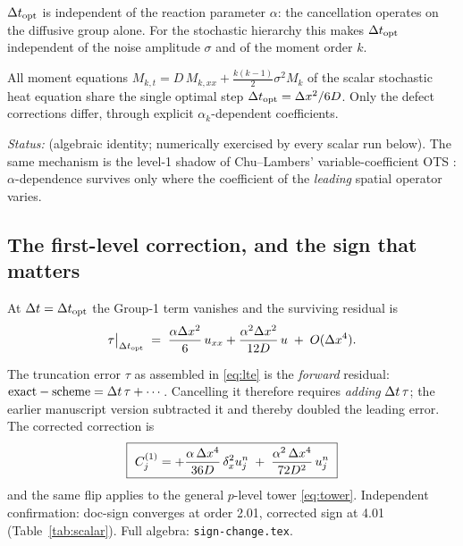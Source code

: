 \begin{proposition}\label{prop:alpha}
$\Delta t_{\mathrm{opt}}$ is independent of the reaction parameter $\alpha$: the cancellation
operates on the diffusive group alone. For the stochastic hierarchy this makes
$\Delta t_{\mathrm{opt}}$ independent of the noise amplitude $\sigma$ and of the moment order $k$.
\end{proposition}

\begin{corollary}\label{cor:indep}
All moment equations $M_{k,t} = D\,M_{k,xx} + \frac{k(k-1)}2\sigma^2 M_k$ of the
scalar stochastic heat equation share the single optimal step $\Delta t_{\mathrm{opt}}=\Delta x^2/6D$.
Only the defect corrections differ, through explicit $\alpha_k$-dependent
coefficients.
\end{corollary}
\noindent\emph{Status:} \tagP (algebraic identity; numerically exercised by every
scalar run below). The same mechanism is the level-1 shadow of
Chu--Lambers' variable-coefficient OTS \citep{chu2009}: $\alpha$-dependence
survives only where the coefficient of the \emph{leading} spatial operator varies.

\subsection{The first-level correction, and the sign that matters}

At $\Delta t=\Delta t_{\mathrm{opt}}$ the Group-1 term vanishes and the surviving residual is
\begin{equation}\label{eq:resid}
\tau\big|_{\Delta t_{\mathrm{opt}}} \;=\;
\frac{\alpha\Delta x^2}6\,u_{xx} + \frac{\alpha^2\Delta x^2}{12D}\,u \;+\; O(\Delta x^4).
\end{equation}
\begin{remark}\label{rem:sign}
The truncation error $\tau$ as assembled in \eqref{eq:lte} is the \emph{forward}
residual: $\text{exact} - \text{scheme} = \Delta t\,\tau + \cdots$. Cancelling it
therefore requires \emph{adding} $\Delta t\,\tau$; the earlier manuscript version
subtracted it and thereby doubled the leading error. The corrected correction is
\begin{equation}\label{eq:C1}
\boxed{\ C^{(1)}_j
= +\frac{\alpha\,\Delta x^4}{36D}\,\delta_x^2 u^n_j
\;+\; \frac{\alpha^2\,\Delta x^4}{72D^2}\,u^n_j\ }
\end{equation}
and the same flip applies to the general $p$-level tower \eqref{eq:tower}.
Independent confirmation: doc-sign converges at order 2.01, corrected sign at
4.01 (Table~\ref{tab:scalar}). Full algebra: \texttt{sign-change.tex}.
\end{remark}

